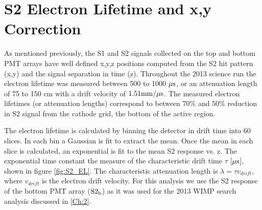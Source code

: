
\section{S2 Electron Lifetime and x,y Correction}

As mentioned previously, the S1 and S2 signals collected on the top and bottom PMT arrays have well defined x,y,z positions computed from the S2 hit pattern (x,y) and the signal separation in time (z). Throughout the 2013 science run the electron lifetime was measured between 500 to 1000 $\rm \mu s$, or an attenuation length of 75 to 150 cm with a drift velocity of $\rm 1.51 mm/\mu s$. The measured electron lifetimes (or attenuation lengths) correspond to between 70\% and 50\% reduction in S2 signal from the cathode grid, the bottom of the active region.
 
The electron lifetime is calculated by binning the detector in drift time into 60 slices. In each bin a Gaussian is fit to extract the mean. Once the mean in each slice is calculated, an exponential is fit to the mean S2 response vs. z. The exponential time constant the measure of the characteristic drift time $\tau$ [$\rm \mu s$], shown in figure \ref{fig:S2_EL}. The characteristic attenuation length is $\lambda = \tau v_{drift}$, where $v_{drift}$ is the electron drift velocity. For this analysis we use the S2 response of the bottom PMT array ($\rm S2_b$) as it was used for the 2013 WIMP search analysis discussed in \ref{Ch:2}. %

